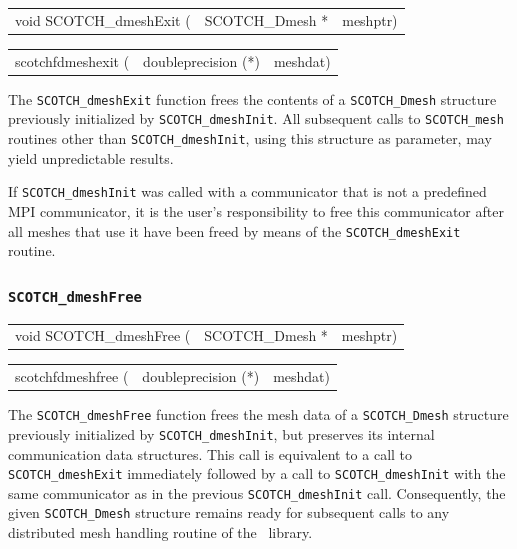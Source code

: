 \begin{itemize}
\progsyn

{\tt\begin{tabular}{l@{}ll}
void SCOTCH\_dmeshExit ( & SCOTCH\_Dmesh * & meshptr)
\end{tabular}}

{\tt\begin{tabular}{l@{}ll}
scotchfdmeshexit ( & doubleprecision (*) & meshdat)
\end{tabular}}

\progdes

The \texttt{SCOTCH\_dmeshExit} function frees the contents of a
\texttt{SCOTCH\_\lbt Dmesh} structure previously initialized by
\texttt{SCOTCH\_\lbt dmeshInit}. All subsequent calls to
\texttt{SCOTCH\_\lbt mesh} routines other than
\texttt{SCOTCH\_\lbt dmesh\lbo Init}, using this structure as
parameter, may yield unpredictable results.

If \texttt{SCOTCH\_\lbt dmesh\lbt Init} was called with a
communicator that is not a predefined MPI communicator, it is
the user's responsibility to free this communicator after
all meshes that use it have been freed by means of the
\texttt{SCOTCH\_\lbt dmesh\lbt Exit} routine.

\end{itemize}

\subsubsection{{\tt SCOTCH\_dmeshFree}}

\begin{itemize}
\progsyn

{\tt\begin{tabular}{l@{}ll}
void SCOTCH\_dmeshFree ( & SCOTCH\_Dmesh * & meshptr)
\end{tabular}}

{\tt\begin{tabular}{l@{}ll}
scotchfdmeshfree ( & doubleprecision (*) & meshdat)
\end{tabular}}

\progdes

The \texttt{SCOTCH\_dmeshFree} function frees the mesh data of a
\texttt{SCOTCH\_\lbt Dmesh} structure previously initialized by
\texttt{SCOTCH\_\lbt dmesh\lbt Init}, but preserves its internal
communication data structures. This call is equivalent to
a call to \texttt{SCOTCH\_\lbt dmesh\lbo Exit} immediately
followed by a call to \texttt{SCOTCH\_\lbt dmesh\lbt Init} with the
same communicator as in the previous
\texttt{SCOTCH\_\lbt dmesh\lbt Init} call. Consequently, the given
\texttt{SCOTCH\_\lbt Dmesh} structure remains ready for subsequent
calls to any distributed mesh handling routine of the
\libscotch\ library.
\end{itemize}

